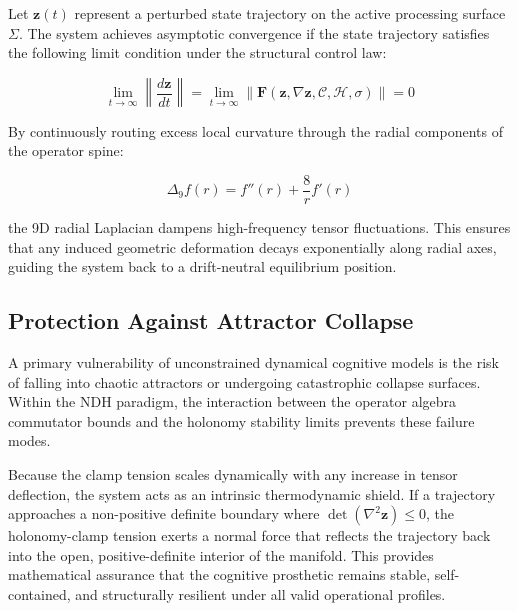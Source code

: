 Let $\mathbf{z}(t)$ represent a perturbed state trajectory on the active processing surface $\Sigma$. The system achieves asymptotic convergence if the state trajectory satisfies the following limit condition under the structural control law:

\[
\lim_{t \to \infty} \left\| \frac{d\mathbf{z}}{dt} \right\| = \lim_{t \to \infty} \left\| \mathbf{F}(\mathbf{z}, \nabla \mathbf{z}, \mathcal{C}, \mathcal{H}, \sigma) \right\| = 0
\]

By continuously routing excess local curvature through the radial components of the operator spine:

\[
\Delta_9 f(r) = f''(r) + \frac{8}{r} f'(r)
\]

the 9D radial Laplacian dampens high-frequency tensor fluctuations. This ensures that any induced geometric deformation decays exponentially along radial axes, guiding the system back to a drift-neutral equilibrium position.

\subsection{Protection Against Attractor Collapse}

A primary vulnerability of unconstrained dynamical cognitive models is the risk of falling into chaotic attractors or undergoing catastrophic collapse surfaces. Within the NDH paradigm, the interaction between the operator algebra commutator bounds and the holonomy stability limits prevents these failure modes. 

Because the clamp tension scales dynamically with any increase in tensor deflection, the system acts as an intrinsic thermodynamic shield. If a trajectory approaches a non-positive definite boundary where $\det(\nabla^2 \mathbf{z}) \le 0$, the holonomy-clamp tension exerts a normal force that reflects the trajectory back into the open, positive-definite interior of the manifold. This provides mathematical assurance that the cognitive prosthetic remains stable, self-contained, and structurally resilient under all valid operational profiles.
